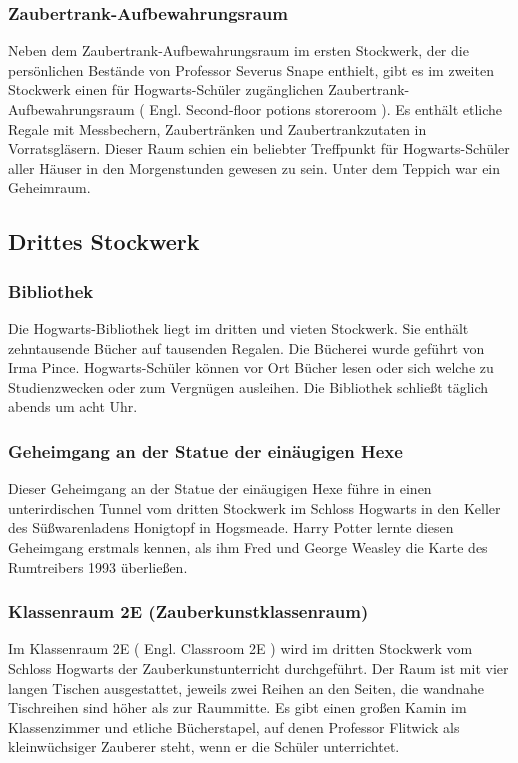 \documentclass[a4paper, 10pt]{article}
\begin{document}
\subsubsection*{\large Zaubertrank-Aufbewahrungsraum}
Neben dem Zaubertrank-Aufbewahrungsraum im ersten Stockwerk, der die persönlichen Bestände von Professor Severus Snape enthielt, gibt es im zweiten Stockwerk einen für Hogwarts-Schüler zugänglichen Zaubertrank-Aufbewahrungsraum (  Engl.  Second-floor potions storeroom ). Es enthält etliche Regale mit Messbechern, Zaubertränken und Zaubertrankzutaten in Vorratsgläsern. Dieser Raum schien ein beliebter Treffpunkt für Hogwarts-Schüler aller Häuser in den Morgenstunden gewesen zu sein. Unter dem Teppich war ein Geheimraum.


\subsection*{\Large Drittes Stockwerk}

\subsubsection*{\large Bibliothek}
Die Hogwarts-Bibliothek liegt im dritten und vieten Stockwerk. Sie enthält zehntausende Bücher auf tausenden Regalen. Die Bücherei wurde geführt von Irma Pince. Hogwarts-Schüler können vor Ort Bücher lesen oder sich welche zu Studienzwecken oder zum Vergnügen ausleihen. Die Bibliothek schließt täglich abends um acht Uhr.
\subsubsection*{\large Geheimgang an der Statue der einäugigen Hexe}
Dieser Geheimgang an der Statue der einäugigen Hexe führe in einen unterirdischen Tunnel vom dritten Stockwerk im Schloss Hogwarts in den Keller des Süßwarenladens Honigtopf in Hogsmeade. Harry Potter lernte diesen Geheimgang erstmals kennen, als ihm Fred und George Weasley die Karte des Rumtreibers 1993 überließen.
\subsubsection*{\large Klassenraum 2E (Zauberkunstklassenraum)}
Im Klassenraum 2E (  Engl.  Classroom 2E ) wird im dritten Stockwerk vom Schloss Hogwarts der Zauberkunstunterricht durchgeführt. Der Raum ist mit vier langen Tischen ausgestattet, jeweils zwei Reihen an den Seiten, die wandnahe Tischreihen sind höher als zur Raummitte. Es gibt einen großen Kamin im Klassenzimmer und etliche Bücherstapel, auf denen Professor Flitwick als kleinwüchsiger Zauberer steht, wenn er die Schüler unterrichtet.
\end{document}
